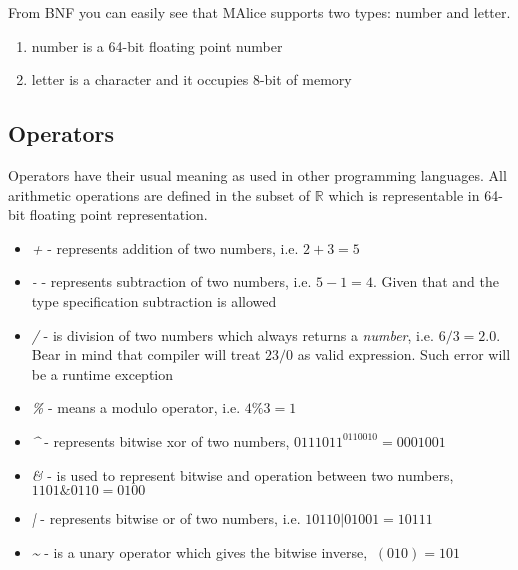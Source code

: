 \documentclass[a4wide, 11pt]{article}
\begin{document}
From BNF you can easily see that MAlice supports two types: number and letter.

\begin{enumerate}
     \item
     number is a 64-bit floating point number

     \item
     letter is a character and it occupies 8-bit of memory

\end{enumerate}

\subsection{Operators}

Operators have their usual meaning as used in other programming languages. All arithmetic operations are defined in the subset of $\mathbb{R}$ which is representable in 64-bit floating point representation.

\begin{itemize}

    \item
    \textit{+} - represents addition of two numbers, i.e. $ 2 + 3 = 5 $

    \item
    \textit{-} - represents subtraction of two numbers, i.e. $ 5 - 1 = 4 $. Given that and the type specification subtraction is allowed 

    \item
    \textit{/} - is division of two numbers which always returns a \emph{number}, i.e. $ 6 / 3 = 2.0 $. Bear in mind that compiler will treat $ 23 / 0 $ as valid expression. Such error will be a runtime exception

    \item
    \textit{\%} - means a modulo operator, i.e. $ 4 \% 3 = 1 $

    \item
    \textit{\^} - represents bitwise xor of two numbers, $ 0111011 ^ 0110010 = 0001001 $

    \item
    \textit{\&} - is used to represent bitwise and operation between two numbers,  $ 1101 \& 0110 = 0100 $

    \item
    \textit{|} - represents bitwise or of two numbers, i.e. $ 10110 | 01001 = 10111 $

    \item
    \textit{\~} - is a unary operator which gives the bitwise inverse, $ ~(010) = 101 $
    
\end{itemize}
\end{document}
